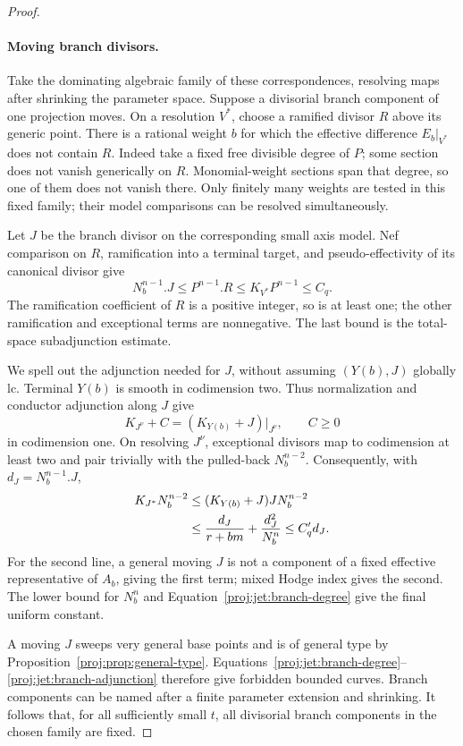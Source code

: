 \begin{proof}
\paragraph{Moving branch divisors.}
Take the dominating algebraic family of these correspondences,
resolving maps after shrinking the parameter space.  Suppose a
divisorial branch component of one projection moves.  On a
resolution \(V^*\), choose a ramified divisor \(R\) above its generic
point.  There is a rational weight \(b\) for which the effective
difference \(E_b|_{V^*}\) does not contain \(R\).
Indeed take a fixed free divisible degree of \(P\); some section
does not vanish generically on \(R\).  Monomial-weight sections
span that degree, so one of them does not vanish there.
Only finitely many weights are tested in this fixed family; their
model comparisons can be resolved simultaneously.

Let \(J\) be the branch divisor on the corresponding small axis
model.  Nef comparison on \(R\), ramification into a terminal
target, and pseudo-effectivity of its canonical divisor give
\begin{equation}\label{proj:jet:branch-degree}
 N_b^{n-1}.J\le P^{n-1}.R
 \le K_{V^*}P^{n-1}\le C_q.
\end{equation}
The ramification coefficient of \(R\) is a positive integer, so is
at least one; the other ramification and exceptional terms are
nonnegative.  The last bound is the total-space subadjunction
estimate.

We spell out the adjunction needed for \(J\), without assuming
\((Y(b),J)\) globally lc.  Terminal \(Y(b)\) is smooth in codimension
two.  Thus normalization and conductor adjunction along \(J\)
give
\[
 K_{J^\nu}+C=(K_{Y(b)}+J)|_{J^\nu},\qquad C\ge0
\]
in codimension one.  On resolving \(J^\nu\), exceptional divisors
map to codimension at least two and pair trivially with the
pulled-back \(N_b^{n-2}\).  Consequently, with
\(d_J=N_b^{n-1}.J\),
\begin{align}
 K_{J^*}N_b^{n-2}
 &\le (K_{Y(b)}+J)J N_b^{n-2}\notag\\
 &\le \frac{d_J}{r+bm}+\frac{d_J^2}{N_b^n}
 \le C'_q d_J.\label{proj:jet:branch-adjunction}
\end{align}
For the second line, a general moving \(J\) is not a component of
a fixed effective representative of \(A_b\), giving the first
term; mixed Hodge index gives the second.  The lower bound for
\(N_b^n\) and Equation~\eqref{proj:jet:branch-degree} give the final
uniform constant.

A moving \(J\) sweeps very general base points and is of general
type by Proposition~\ref{proj:prop:general-type}.
Equations~\eqref{proj:jet:branch-degree}--\eqref{proj:jet:branch-adjunction}
therefore give forbidden bounded curves.  Branch components can
be named after a finite parameter extension and shrinking.
It follows that, for all sufficiently small \(t\), all divisorial
branch components in the chosen family are fixed.


\end{proof}
